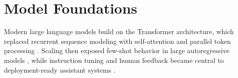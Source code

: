 \section{Model Foundations}

Modern large language models build on the Transformer architecture, which
replaced recurrent sequence modeling with self-attention and parallel token
processing \citep{vaswani2017attention}. Scaling then exposed few-shot
behavior in large autoregressive models \citep{brown2020language}, while
instruction tuning and human feedback became central to deployment-ready
assistant systems \citep{ouyang2022training}.
